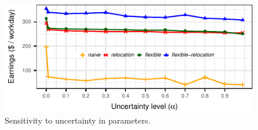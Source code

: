 \begin{figure}[hb]
	\centering
	\includegraphics{figures/uncertainty_evolution.pdf}
	\setlength{\belowcaptionskip}{-10pt}
	\caption{Sensitivity to uncertainty in parameters.}
	\label{fig:uncertainty_evolution}
\end{figure}





